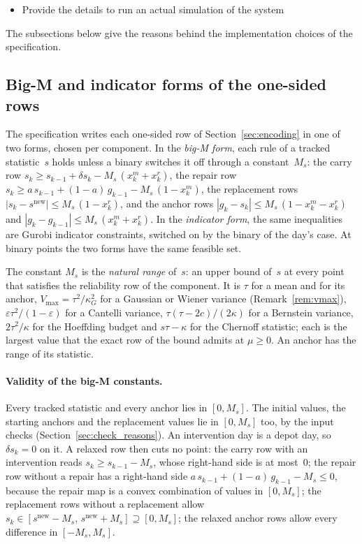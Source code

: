 \documentclass[11pt,a4paper]{article}
\theoremstyle{plain}
\theoremstyle{definition}
\theoremstyle{remark}
\begin{document}
\begin{itemize}
	\item Provide the details to run an actual simulation of the system
\end{itemize}

The subsections below give the reasons behind the implementation choices of the specification.

\subsection{Big-M and indicator forms of the one-sided rows}
\label{sec:impl_encoding}

The specification writes each one-sided row of Section~\ref{sec:encoding} in one of two forms, chosen per component.
In the \emph{big-M form}, each rule of a tracked statistic~$s$ holds unless a binary switches it off through a constant~$M_s$: the carry row $s_k \ge s_{k-1} + \delta s_k - M_s\,(x^m_k + x^r_k)$, the repair row $s_k \ge a\,s_{k-1} + (1-a)\,g_{k-1} - M_s\,(1 - x^m_k)$, the replacement rows $|s_k - s^{\mathrm{new}}| \le M_s\,(1 - x^r_k)$, and the anchor rows $|g_k - s_k| \le M_s\,(1 - x^m_k - x^r_k)$ and $|g_k - g_{k-1}| \le M_s\,(x^m_k + x^r_k)$.
In the \emph{indicator form}, the same inequalities are Gurobi indicator constraints, switched on by the binary of the day's case.
At binary points the two forms have the same feasible set.

The constant $M_s$ is the \emph{natural range} of~$s$: an upper bound of~$s$ at every point that satisfies the reliability row of the component.
It is $\tau$ for a mean and for its anchor, $V_{\max} = \tau^2/\kappa_G^2$ for a Gaussian or Wiener variance (Remark~\ref{rem:vmax}), $\varepsilon\tau^2/(1-\varepsilon)$ for a Cantelli variance, $\tau(\tau - 2c)/(2\kappa)$ for a Bernstein variance, $2\tau^2/\kappa$ for the Hoeffding budget and $s\tau - \kappa$ for the Chernoff statistic; each is the largest value that the exact row of the bound admits at $\mu \ge 0$.
An anchor has the range of its statistic.

\paragraph{Validity of the big-M constants.}
Every tracked statistic and every anchor lies in $[0, M_s]$.
The initial values, the starting anchors and the replacement values lie in $[0, M_s]$ too, by the input checks (Section~\ref{sec:check_reasons}).
An intervention day is a depot day, so $\delta s_k = 0$ on it.
A relaxed row then cuts no point: the carry row with an intervention reads $s_k \ge s_{k-1} - M_s$, whose right-hand side is at most~$0$; the repair row without a repair has a right-hand side $a\,s_{k-1} + (1-a)\,g_{k-1} - M_s \le 0$, because the repair map is a convex combination of values in $[0, M_s]$; the replacement rows without a replacement allow $s_k \in [s^{\mathrm{new}} - M_s,\, s^{\mathrm{new}} + M_s] \supseteq [0, M_s]$; the relaxed anchor rows allow every difference in $[-M_s, M_s]$.
\end{document}
